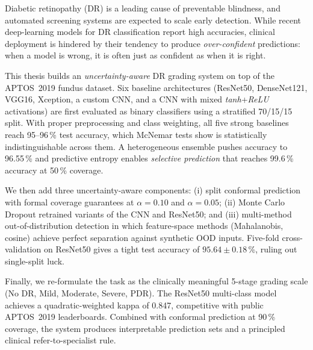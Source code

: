 Diabetic retinopathy (DR) is a leading cause of preventable blindness, and
automated screening systems are expected to scale early detection. While
recent deep-learning models for DR classification report high accuracies,
clinical deployment is hindered by their tendency to produce
\emph{over-confident} predictions: when a model is wrong, it is often
just as confident as when it is right.

This thesis builds an \emph{uncertainty-aware} DR grading system on top of
the APTOS~2019 fundus dataset. Six baseline architectures (ResNet50,
DenseNet121, VGG16, Xception, a custom CNN, and a CNN with mixed
\textit{tanh}+\textit{ReLU} activations) are first evaluated as binary
classifiers using a stratified 70/15/15 split. With proper preprocessing
and class weighting, all five strong baselines reach 95--96\,\%
test accuracy, which McNemar tests show is statistically indistinguishable
across them. A heterogeneous ensemble pushes accuracy to 96.55\,\% and
predictive entropy enables \emph{selective prediction} that reaches
99.6\,\% accuracy at 50\,\% coverage.

We then add three uncertainty-aware components: (i) split conformal
prediction with formal coverage guarantees at $\alpha = 0.10$ and
$\alpha = 0.05$; (ii) Monte Carlo Dropout retrained variants of the CNN
and ResNet50; and (iii) multi-method out-of-distribution detection in
which feature-space methods (Mahalanobis, cosine) achieve perfect
separation against synthetic OOD inputs. Five-fold cross-validation
on ResNet50 gives a tight test accuracy of $95.64 \pm 0.18$\,\%, ruling out
single-split luck.

Finally, we re-formulate the task as the clinically meaningful 5-stage
grading scale (No DR, Mild, Moderate, Severe, PDR). The ResNet50
multi-class model achieves a quadratic-weighted kappa of 0.847,
competitive with public APTOS~2019 leaderboards. Combined with conformal
prediction at 90\,\% coverage, the system produces interpretable
prediction sets and a principled clinical refer-to-specialist rule.
